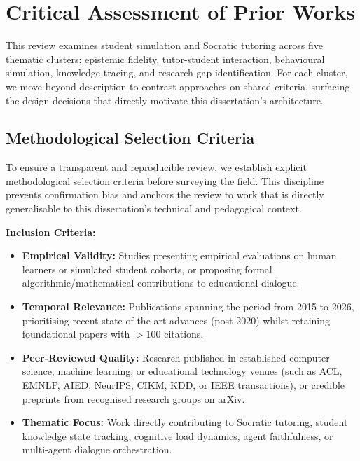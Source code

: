 \documentclass[11pt,a4paper]{report}
\begin{document}
\section{Critical Assessment of Prior Works}
This review examines student simulation and Socratic tutoring across five thematic clusters: epistemic fidelity, tutor-student interaction, behavioural simulation, knowledge tracing, and research gap identification. For each cluster, we move beyond description to contrast approaches on shared criteria, surfacing the design decisions that directly motivate this dissertation's architecture.

\subsection{Methodological Selection Criteria}
To ensure a transparent and reproducible review, we establish explicit methodological selection criteria before surveying the field. This discipline prevents confirmation bias and anchors the review to work that is directly generalisable to this dissertation's technical and pedagogical context.

\noindent\textbf{Inclusion Criteria:}
\begin{itemize}
    \item \textbf{Empirical Validity:} Studies presenting empirical evaluations on human learners or simulated student cohorts, or proposing formal algorithmic/mathematical contributions to educational dialogue.
    \item \textbf{Temporal Relevance:} Publications spanning the period from 2015 to 2026, prioritising recent state-of-the-art advances (post-2020) whilst retaining foundational papers with $>100$ citations.
    \item \textbf{Peer-Reviewed Quality:} Research published in established computer science, machine learning, or educational technology venues (such as ACL, EMNLP, AIED, NeurIPS, CIKM, KDD, or IEEE transactions), or credible preprints from recognised research groups on arXiv.
    \item \textbf{Thematic Focus:} Work directly contributing to Socratic tutoring, student knowledge state tracking, cognitive load dynamics, agent faithfulness, or multi-agent dialogue orchestration.
\end{itemize}
\end{document}
